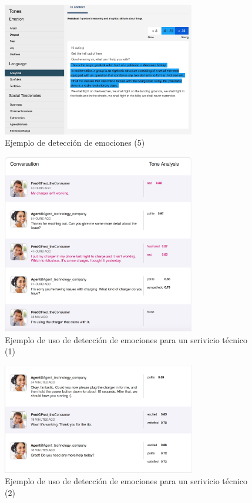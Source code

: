 \documentclass[paper=a4, fontsize=10pt]{scrartcl} %
\numberwithin{equation}{section} %
\numberwithin{figure}{section} %
\numberwithin{table}{section} %
\begin{document}
\begin{figure}[H]
			\centering
			\label{analytical.jpg}
			\includegraphics[width=0.75\textwidth]{./Imagenes/analytical.jpeg}
			\caption{Ejemplo de detección de emociones (5)}
\end{figure}

\begin{figure}[H]
			\centering
			\label{conversacion1.jpg}
			\includegraphics[width=0.75\textwidth]{./Imagenes/conversacion1.jpeg}
			\caption{Ejemplo de uso de detección de emociones para un serivicio técnico (1)}
\end{figure}

\begin{figure}[H]
			\centering
			\label{conversacion2.jpg}
			\includegraphics[width=0.75\textwidth]{./Imagenes/conversacion2.jpeg}
			\caption{Ejemplo de uso de detección de emociones para un serivicio técnico (2)}
\end{figure}
\end{document}
